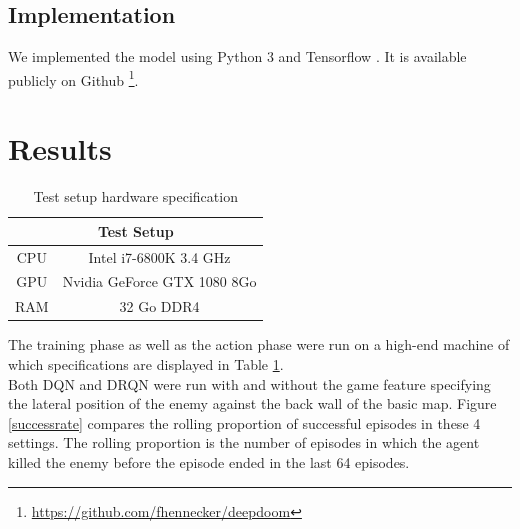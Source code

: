 \documentclass[letterpaper]{article}
\newcommand\Tstrut{\rule{0pt}{2.6ex}}
\begin{document}
\subsection{Implementation}
We implemented the model using Python 3 and Tensorflow \citep{tensorflow}.
It is available publicly on Github
\footnote{\url{https://github.com/fhennecker/deepdoom}}.



\section{Results}
%

\begin{table}[h]
\centering
\begin{tabular}{cc}
\multicolumn{2}{c}{Test Setup}                         \Tstrut\\ \hline
\multicolumn{1}{c|}{CPU} & Intel i7-6800K 3.4 GHz      \Tstrut\\
\multicolumn{1}{c|}{GPU} & Nvidia GeForce GTX 1080 8Go \Tstrut\\
\multicolumn{1}{c|}{RAM} & 32 Go DDR4                      \Tstrut
\end{tabular}
\caption{Test setup hardware specification}
\label{tab:specs}
\end{table}

The training phase as well as the action phase were run on a high-end machine
of which specifications are displayed in Table \ref{tab:specs}.\\

Both DQN and DRQN were run with and without the game feature specifying the
lateral position of the enemy against the back wall of the basic map. Figure
\ref{successrate} compares the rolling proportion of successful episodes
in these 4 settings. The rolling proportion is the number of episodes in which
the agent killed the enemy before the episode ended in the last 64 episodes.
\end{document}
